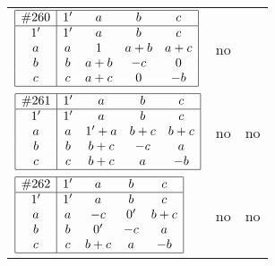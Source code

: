 \documentclass[12pt]{article}
\theoremstyle{definition}
\newcommand{\join}{\mathbin{+}}%
\newcommand{\id}{{1'}}%
\renewcommand{\div}{0'}
\renewcommand{\top}{1}%
\begin{document}
\begin{center}
\begin{longtable}{l|c|c}
$
\begin{array}{|c|cccc|} \hline
\#260 & \id & a & b & c \\ \hline
\id & \id & a & b & c \\
a & a & \top & a \join b & a \join c \\
b & b & a \join b & -c & 0 \\
c & c & a \join c & 0 & -b \\ \hline
\end{array}
$
 & no  
 & \adjustbox{valign=c, max height=1.6cm}{$
\left[ \begin{array}{cccccccc}
\id & a & a & b & a & a & b & a \\ 
a & \id & a & a & c & a & a & c \\ 
a & a & \id & b & a & a & b & a \\ 
b & a & b & \id & a & a & b & a \\ 
a & c & a & a & \id & c & a & c \\ 
a & a & a & a & c & \id & a & c \\ 
b & a & b & b & a & a & \id & a \\ 
a & c & a & a & c & c & a & \id
\end{array}\right]
$}      \\[15mm]

$
\begin{array}{|c|cccc|} \hline
\#261 & \id & a & b & c \\ \hline
\id & \id & a & b & c \\
a & a & \id \join a & b \join c & b \join c \\
b & b & b \join c & -c & a \\
c & c & b \join c & a & -b \\ \hline
\end{array}
$
 & no  
 & no      \\[15mm]

$
\begin{array}{|c|cccc|} \hline
\#262 & \id & a & b & c \\ \hline
\id & \id & a & b & c \\
a & a & -c & \div & b \join c \\
b & b & \div & -c & a \\
c & c & b \join c & a & -b \\ \hline
\end{array}
$
 & no  
 & no      \\[15mm]


\end{longtable}
\end{center}
\end{document}
